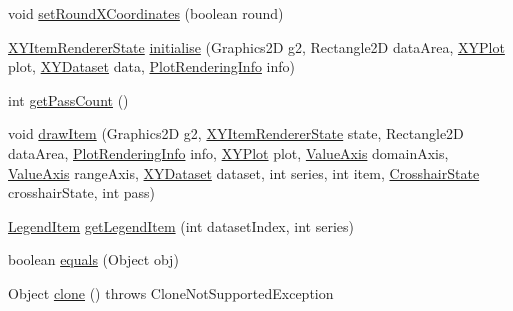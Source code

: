 \begin{DoxyCompactItemize}
\item 
void \mbox{\hyperlink{classorg_1_1jfree_1_1chart_1_1renderer_1_1xy_1_1_x_y_difference_renderer_add148660ff1686d7228fd9a525ccb23c}{set\+Round\+X\+Coordinates}} (boolean round)
\item 
\mbox{\hyperlink{classorg_1_1jfree_1_1chart_1_1renderer_1_1xy_1_1_x_y_item_renderer_state}{X\+Y\+Item\+Renderer\+State}} \mbox{\hyperlink{classorg_1_1jfree_1_1chart_1_1renderer_1_1xy_1_1_x_y_difference_renderer_a321b09ac31585be554651722cbfc5999}{initialise}} (Graphics2D g2, Rectangle2D data\+Area, \mbox{\hyperlink{classorg_1_1jfree_1_1chart_1_1plot_1_1_x_y_plot}{X\+Y\+Plot}} plot, \mbox{\hyperlink{interfaceorg_1_1jfree_1_1data_1_1xy_1_1_x_y_dataset}{X\+Y\+Dataset}} data, \mbox{\hyperlink{classorg_1_1jfree_1_1chart_1_1plot_1_1_plot_rendering_info}{Plot\+Rendering\+Info}} info)
\item 
int \mbox{\hyperlink{classorg_1_1jfree_1_1chart_1_1renderer_1_1xy_1_1_x_y_difference_renderer_af088bc6e1bb9053e14e3396d2fab0927}{get\+Pass\+Count}} ()
\item 
void \mbox{\hyperlink{classorg_1_1jfree_1_1chart_1_1renderer_1_1xy_1_1_x_y_difference_renderer_aeeb60b499c55775019afd281710179b4}{draw\+Item}} (Graphics2D g2, \mbox{\hyperlink{classorg_1_1jfree_1_1chart_1_1renderer_1_1xy_1_1_x_y_item_renderer_state}{X\+Y\+Item\+Renderer\+State}} state, Rectangle2D data\+Area, \mbox{\hyperlink{classorg_1_1jfree_1_1chart_1_1plot_1_1_plot_rendering_info}{Plot\+Rendering\+Info}} info, \mbox{\hyperlink{classorg_1_1jfree_1_1chart_1_1plot_1_1_x_y_plot}{X\+Y\+Plot}} plot, \mbox{\hyperlink{classorg_1_1jfree_1_1chart_1_1axis_1_1_value_axis}{Value\+Axis}} domain\+Axis, \mbox{\hyperlink{classorg_1_1jfree_1_1chart_1_1axis_1_1_value_axis}{Value\+Axis}} range\+Axis, \mbox{\hyperlink{interfaceorg_1_1jfree_1_1data_1_1xy_1_1_x_y_dataset}{X\+Y\+Dataset}} dataset, int series, int item, \mbox{\hyperlink{classorg_1_1jfree_1_1chart_1_1plot_1_1_crosshair_state}{Crosshair\+State}} crosshair\+State, int pass)
\item 
\mbox{\hyperlink{classorg_1_1jfree_1_1chart_1_1_legend_item}{Legend\+Item}} \mbox{\hyperlink{classorg_1_1jfree_1_1chart_1_1renderer_1_1xy_1_1_x_y_difference_renderer_abba5d25319950deb90984aef12ef0486}{get\+Legend\+Item}} (int dataset\+Index, int series)
\item 
boolean \mbox{\hyperlink{classorg_1_1jfree_1_1chart_1_1renderer_1_1xy_1_1_x_y_difference_renderer_ada62f76797498acf112de700f98c9424}{equals}} (Object obj)
\item 
Object \mbox{\hyperlink{classorg_1_1jfree_1_1chart_1_1renderer_1_1xy_1_1_x_y_difference_renderer_ab7683180f6fe46e4cf99438659143aa0}{clone}} ()  throws Clone\+Not\+Supported\+Exception 
\end{DoxyCompactItemize}
